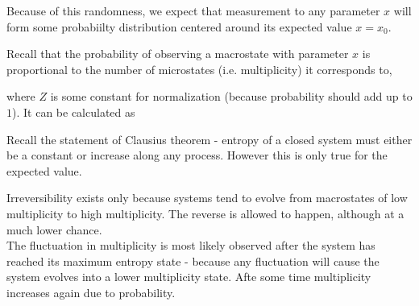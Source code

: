 \documentclass[class=article, crop=false, 12pt]{standalone}
\begin{document}

Because of this randomness, 
we expect that measurement to any parameter $x$ will form some probabiilty distribution centered around its expected value $x=x_0$.
\begin{center}
\end{center}

Recall that the probability of observing a macrostate with parameter $x$ 
is proportional to the number of microstates (i.e. multiplicity) it corresponds to,

where $Z$ is some constant for normalization (because probability should add up to $1$).
It can be calculated as

\begin{notation}
    Recall the statement of Clausius theorem - 
    entropy of a closed system must either be a constant 
    or increase along any process.
    However this is only true for the expected value. 

    Irreversibility exists only because systems tend to evolve from 
    macrostates of low multiplicity to high multiplicity.
    The reverse is allowed to happen,
    although at a much lower chance.\\

    The fluctuation in multiplicity is most likely observed after the system has reached its maximum entropy state - 
    because any fluctuation will cause the system evolves into a lower multiplicity state.
    Afte some time  multiplicity increases again due to probability.
\end{notation}
\end{document}
